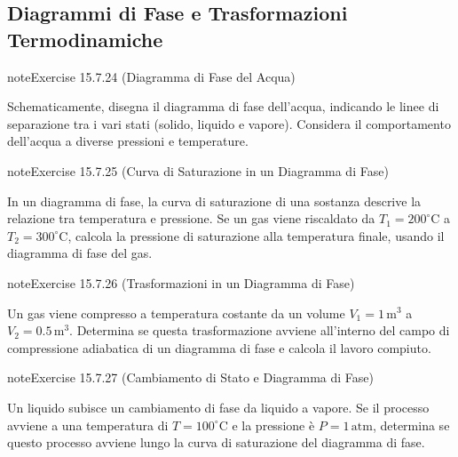 \documentclass[letterpaper,10pt,italian]{jupyterBook}
\begin{document}
\subsection{Diagrammi di Fase e Trasformazioni Termodinamiche}
\label{\detokenize{ch/thermodynamics/principles-problems:diagrammi-di-fase-e-trasformazioni-termodinamiche}} \label{exercise:ch/thermodynamics/principles-problems-exercise-23}

\begin{sphinxadmonition}{note}{Exercise 15.7.24 (Diagramma di Fase del Acqua)}



\sphinxAtStartPar
Schematicamente, disegna il diagramma di fase dell’acqua, indicando le linee di separazione tra i vari stati (solido, liquido e vapore). Considera il comportamento dell’acqua a diverse pressioni e temperature.
\end{sphinxadmonition}
 \label{exercise:ch/thermodynamics/principles-problems-exercise-24}

\begin{sphinxadmonition}{note}{Exercise 15.7.25 (Curva di Saturazione in un Diagramma di Fase)}



\sphinxAtStartPar
In un diagramma di fase, la curva di saturazione di una sostanza descrive la relazione tra temperatura e pressione. Se un gas viene riscaldato da \(T_1 = 200^\circ \text{C}\) a \(T_2 = 300^\circ \text{C}\), calcola la pressione di saturazione alla temperatura finale, usando il diagramma di fase del gas.
\end{sphinxadmonition}
 \label{exercise:ch/thermodynamics/principles-problems-exercise-25}

\begin{sphinxadmonition}{note}{Exercise 15.7.26 (Trasformazioni in un Diagramma di Fase)}



\sphinxAtStartPar
Un gas viene compresso a temperatura costante da un volume \(V_1 = 1 \, \text{m}^3\) a \(V_2 = 0.5 \, \text{m}^3\). Determina se questa trasformazione avviene all’interno del campo di compressione adiabatica di un diagramma di fase e calcola il lavoro compiuto.
\end{sphinxadmonition}
 \label{exercise:ch/thermodynamics/principles-problems-exercise-26}

\begin{sphinxadmonition}{note}{Exercise 15.7.27 (Cambiamento di Stato e Diagramma di Fase)}



\sphinxAtStartPar
Un liquido subisce un cambiamento di fase da liquido a vapore. Se il processo avviene a una temperatura di \(T = 100^\circ \text{C}\) e la pressione è \(P = 1 \, \text{atm}\), determina se questo processo avviene lungo la curva di saturazione del diagramma di fase.
\end{sphinxadmonition}
 \label{exercise:ch/thermodynamics/principles-problems-exercise-27}
\end{document}
